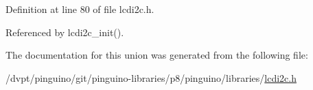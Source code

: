 Definition at line 80 of file lcdi2c.\-h.



Referenced by lcdi2c\-\_\-init().



The documentation for this union was generated from the following file\-:\begin{DoxyCompactItemize}
\item 
/dvpt/pinguino/git/pinguino-\/libraries/p8/pinguino/libraries/\hyperlink{p8_2pinguino_2libraries_2lcdi2c_8h}{lcdi2c.\-h}\end{DoxyCompactItemize}
